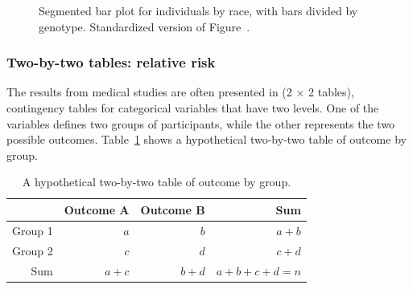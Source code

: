 \begin{figure}[h!]
	\centering
	\caption{ Segmented bar plot for individuals by race, with bars divided by genotype.  Standardized version of Figure~.}
	\label{famussSegBarPlotB}
\end{figure}

\subsubsection{Two-by-two tables: relative risk}

The results from medical studies are often presented in  (2 $\times$ 2 tables), contingency tables for categorical variables that have two levels. One of the variables defines two groups of participants, while the other represents the two possible outcomes. Table~\ref{TwoByTwoTable} shows a hypothetical two-by-two table of outcome by group.

\begin{table}
	\centering
	\begin{tabular}{r|rrr}
		\hline
		& Outcome A & Outcome B & Sum\\ 
		\hline
		Group 1 & $a$ & $b$ & $a + b$ \\ 
		Group 2 & $c$ & $d$ & $c + d$ \\
		Sum & $a + c$ & $b + d$ & $a + b + c + d = n$ \\
		\hline
	\end{tabular}	
	\caption{A hypothetical two-by-two table of outcome by group.}
	\label{TwoByTwoTable} 
\end{table}

